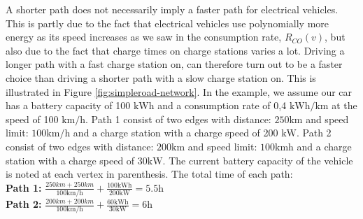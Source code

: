A shorter path does not necessarily imply a faster path for electrical vehicles. This is partly due to the fact that electrical vehicles use polynomially more energy as its speed increases as we saw in the consumption rate, $R_{CO}(v)$, but also due to the fact that charge times on charge stations varies a lot. 
Driving a longer path with a fast charge station on, can therefore turn out to be a faster choice than driving a shorter path with a slow charge station on. This is illustrated in Figure \ref{fig:simpleroad-network}. In the example, we assume our car has a battery capacity of 100 $\si{\kWh}$ and a consumption rate of 0,4 $\si{\kWh\per\km}$ at the speed of 100 $\si{\km\per\hour}$. Path 1 consist of two edges with distance: $ 250 \si{\km}$ and speed limit: $100 \si{\km\per\hour}$
and a charge station with a charge speed of 200 $\si{\kW}$. Path 2 consist of two edges with
distance: $200 \si{\km}$ and speed limit: $100 \si{\km\hour}$ and a charge station with a charge speed of $30\si{\kW}$. The current battery capacity of the vehicle is noted at each vertex in parenthesis. The total time of each path:\\
				
\textbf{Path 1:} $\frac{250\si{km} + 250\si{km}}{100\si{\km\per\hour}} + \frac{100\si{\kWh}}{200\si{\kW}} = 5.5\si{\hour}$\\

\textbf{Path 2:} $\frac{200\si{km} + 200\si{km}}{100 \si{\km\per\hour}} + \frac{60\si{\kWh}}{30\si{\kW}} = 6\si{\hour}$